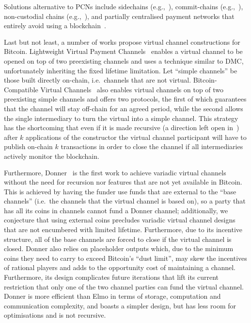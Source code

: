   Solutions alternative to PCNs include side\-chains
  (e.g.,~\cite{BCDF+14,sidechains,KiaZin18}), commit-chains
  (e.g.,~\cite{plasma}), non-custo\-dial chains
  (e.g.,~\cite{plasma,konstantopoulos2019plasma,plasma-lower-bounds}),
  and partially centralised payment networks that entirely avoid using a
  blockchain~\cite{DBLP:conf/trust/ArmknechtKMYZ15,stellar,silentwhispers,DBLP:conf/ndss/RoosMKG18}.

  Last but not least, a number of works propose virtual channel constructions
  for Bitcoin. Lightweight Virtual Payment
  Channels~\cite{10.1007/978-3-030-65411-5_18} enables a virtual channel to be
  opened on top of two preexisting channels and uses a technique similar to DMC,
  unfortunately inheriting the fixed lifetime limitation.
  Let ``simple channels'' be those built directly on-chain, i.e.\ channels that are not
  virtual.
  Bitcoin-Compatible Virtual Channels~\cite{9519487} also enables
  virtual channels on top of two preexisting simple channels
  and offers two protocols, the first of which guarantees that the channel will
  stay off-chain for an agreed period, while the second allows the single intermediary
  to turn the virtual into a simple channel.
  This strategy has the shortcoming that even if it is made
  recursive (a direction left open in~\cite{9519487}) after $k$
  applications of the constructor the virtual channel participant will have to
  publish on-chain $k$ transactions in order to close the channel if all
  intermediaries actively monitor the blockchain.

  Furthermore, Donner~\cite{donner} is the first work to achieve variadic
  virtual channels without the need for recursion nor features that are not yet
  available in Bitcoin. This is achieved by having the funder use funds that are
  external to the ``base channels'' (i.e.\ the channels that the virtual channel
  is based on), so a party that has all its coins in channels cannot fund a
  Donner channel; additionally, we conjecture that using external coins
  precludes variadic virtual channel designs that are not encumbered with
  limited lifetime. Furthermore, due to its incentive structure, all of the
  base channels are forced to close if the virtual channel is closed.
  Donner also relies on placeholder outputs
  which, due to the minimum coins they need to carry to exceed Bitcoin's ``dust
  limit'', may skew the incentives of rational players and adds to the
  opportunity cost of maintaining a channel. Furthermore, its design complicates
  future iterations that lift its current restriction that only one of the two
  channel parties can fund the virtual channel. Donner is more efficient than
  Elmo in terms of storage, computation and communication
  complexity, and boasts a simpler design, but has less room for optimisations
  and is not recursive.

